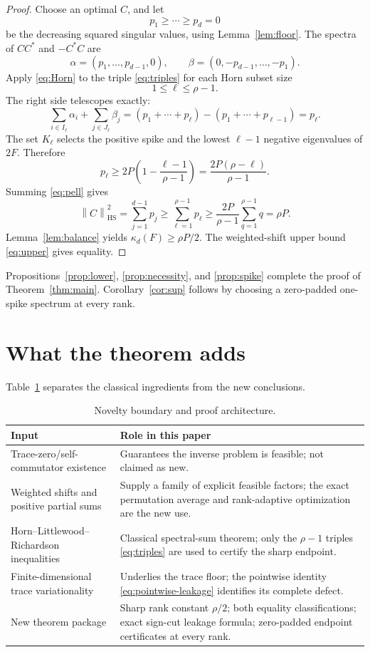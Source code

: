 \documentclass[11pt]{article}
\theoremstyle{definition}
\theoremstyle{remark}
\newcommand{\1}{\mathbf 1}
\newcommand{\norm}[1]{\left\lVert #1\right\rVert}
\newcommand{\HS}{\mathrm{HS}}
\begin{document}
\begin{proof}
Choose an optimal $C$, and let
\[
 p_1\ge\cdots\ge p_d=0
\]
be the decreasing squared singular values, using Lemma~\ref{lem:floor}.  The spectra of $CC^*$ and $-C^*C$ are
\[
 \alpha=(p_1,\ldots,p_{d-1},0),
 \qquad \beta=(0,-p_{d-1},\ldots,-p_1).
\]
Apply \eqref{eq:Horn} to the triple \eqref{eq:triples} for each Horn subset size
\[
 1\le\ell\le\rho-1.
\]
The right side telescopes exactly:
\[
 \sum_{i\in I_\ell}\alpha_i+\sum_{j\in J_\ell}\beta_j
 =(p_1+\cdots+p_\ell)-(p_1+\cdots+p_{\ell-1})=p_\ell.
\]
The set $K_\ell$ selects the positive spike and the lowest $\ell-1$ negative eigenvalues of $2F$.  Therefore
\begin{equation}
 p_\ell\ge 2P\left(1-\frac{\ell-1}{\rho-1}\right)
 =\frac{2P(\rho-\ell)}{\rho-1}.
 \label{eq:pell}
\end{equation}
Summing \eqref{eq:pell} gives
\[
 \norm C_{\HS}^2=\sum_{j=1}^{d-1}p_j
 \ge\sum_{\ell=1}^{\rho-1}p_\ell
 \ge\frac{2P}{\rho-1}\sum_{q=1}^{\rho-1}q
 =\rho P.
\]
Lemma~\ref{lem:balance} yields $\kappa_d(F)\ge\rho P/2$.  The weighted-shift upper bound \eqref{eq:upper} gives equality.
\end{proof}

Propositions~\ref{prop:lower}, \ref{prop:necessity}, and \ref{prop:spike} complete the proof of Theorem~\ref{thm:main}.  Corollary~\ref{cor:sup} follows by choosing a zero-padded one-spike spectrum at every rank.

\section{What the theorem adds}

Table~\ref{tab:structure} separates the classical ingredients from the new conclusions.

\begin{table}[ht]
\centering
\small
\begin{tabular}{>{\raggedright\arraybackslash}p{}>{\raggedright\arraybackslash}p{}}
\toprule
Input & Role in this paper \\
\midrule
Trace-zero/self-commutator existence & Guarantees the inverse problem is feasible; not claimed as new. \\
Weighted shifts and positive partial sums & Supply a family of explicit feasible factors; the exact permutation average and rank-adaptive optimization are the new use. \\
Horn--Littlewood--Richardson inequalities & Classical spectral-sum theorem; only the $\rho-1$ triples \eqref{eq:triples} are used to certify the sharp endpoint. \\
Finite-dimensional trace variationality & Underlies the trace floor; the pointwise identity \eqref{eq:pointwise-leakage} identifies its complete defect. \\
\midrule
New theorem package & Sharp rank constant $\rho/2$; both equality classifications; exact sign-cut leakage formula; zero-padded endpoint certificates at every rank. \\
\bottomrule
\end{tabular}
\caption{Novelty boundary and proof architecture.}
\label{tab:structure}
\end{table}
\end{document}
